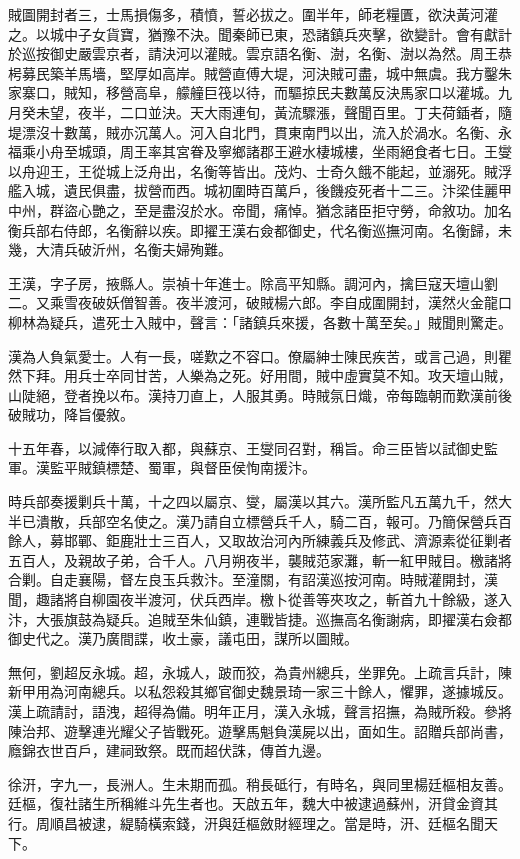 \begin{pinyinscope}
賊圖開封者三，士馬損傷多，積憤，誓必拔之。圍半年，師老糧匱，欲決黃河灌之。以城中子女貨寶，猶豫不決。聞秦師已東，恐諸鎮兵夾擊，欲變計。會有獻計於巡按御史嚴雲京者，請決河以灌賊。雲京語名衡、澍，名衡、澍以為然。周王恭枵募民築羊馬墻，堅厚如高岸。賊營直傅大堤，河決賊可盡，城中無虞。我方鑿朱家寨口，賊知，移營高阜，艨艟巨筏以待，而驅掠民夫數萬反決馬家口以灌城。九月癸未望，夜半，二口並決。天大雨連旬，黃流驟漲，聲聞百里。丁夫荷鍤者，隨堤漂沒十數萬，賊亦沉萬人。河入自北門，貫東南門以出，流入於渦水。名衡、永福乘小舟至城頭，周王率其宮眷及寧鄉諸郡王避水棲城樓，坐雨絕食者七日。王燮以舟迎王，王從城上泛舟出，名衡等皆出。茂灼、士奇久餓不能起，並溺死。賊浮艦入城，遺民俱盡，拔營而西。城初圍時百萬戶，後饑疫死者十二三。汴梁佳麗甲中州，群盜心艷之，至是盡沒於水。帝聞，痛悼。猶念諸臣拒守勞，命敘功。加名衡兵部右侍郎，名衡辭以疾。即擢王漢右僉都御史，代名衡巡撫河南。名衡歸，未幾，大清兵破沂州，名衡夫婦殉難。

王漢，字子房，掖縣人。崇禎十年進士。除高平知縣。調河內，擒巨寇天壇山劉二。又乘雪夜破妖僧智善。夜半渡河，破賊楊六郎。李自成圍開封，漢然火金龍口柳林為疑兵，遣死士入賊中，聲言：「諸鎮兵來援，各數十萬至矣。」賊聞則驚走。

漢為人負氣愛士。人有一長，嗟歎之不容口。僚屬紳士陳民疾苦，或言己過，則瞿然下拜。用兵士卒同甘苦，人樂為之死。好用間，賊中虛實莫不知。攻天壇山賊，山陡絕，登者挽以布。漢持刀直上，人服其勇。時賊氛日熾，帝每臨朝而歎漢前後破賊功，降旨優敘。

十五年春，以減俸行取入都，與蘇京、王燮同召對，稱旨。命三臣皆以試御史監軍。漢監平賊鎮標楚、蜀軍，與督臣侯恂南援汴。

時兵部奏援剿兵十萬，十之四以屬京、燮，屬漢以其六。漢所監凡五萬九千，然大半已潰散，兵部空名使之。漢乃請自立標營兵千人，騎二百，報可。乃簡保營兵百餘人，募邯鄲、鉅鹿壯士三百人，又取故治河內所練義兵及修武、濟源素從征剿者五百人，及親故子弟，合千人。八月朔夜半，襲賊范家灘，斬一紅甲賊目。檄諸將合剿。自走襄陽，督左良玉兵救汴。至潼關，有詔漢巡按河南。時賊灌開封，漢聞，趣諸將自柳園夜半渡河，伏兵西岸。檄卜從善等夾攻之，斬首九十餘級，遂入汴，大張旗鼓為疑兵。追賊至朱仙鎮，連戰皆捷。巡撫高名衡謝病，即擢漢右僉都御史代之。漢乃廣間諜，收土豪，議屯田，謀所以圖賊。

無何，劉超反永城。超，永城人，跛而狡，為貴州總兵，坐罪免。上疏言兵計，陳新甲用為河南總兵。以私怨殺其鄉官御史魏景琦一家三十餘人，懼罪，遂據城反。漢上疏請討，語洩，超得為備。明年正月，漢入永城，聲言招撫，為賊所殺。參將陳治邦、遊擊連光耀父子皆戰死。遊擊馬魁負漢屍以出，面如生。詔贈兵部尚書，廕錦衣世百戶，建祠致祭。既而超伏誅，傳首九邊。

徐汧，字九一，長洲人。生未期而孤。稍長砥行，有時名，與同里楊廷樞相友善。廷樞，復社諸生所稱維斗先生者也。天啟五年，魏大中被逮過蘇州，汧貸金資其行。周順昌被逮，緹騎橫索錢，汧與廷樞斂財經理之。當是時，汧、廷樞名聞天下。


\end{pinyinscope}
